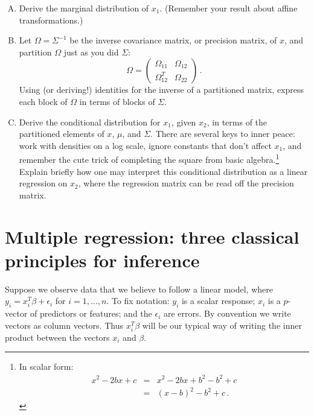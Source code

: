 \documentclass{mynotes}
\begin{document}
\begin{enumerate}[(A)]

\item Derive the marginal distribution of $x_1$. (Remember your result about affine transformations.)

\item Let $\Omega = \Sigma^{-1}$ be the inverse covariance matrix, or precision matrix, of $x$, and partition $\Omega$ just as you did $\Sigma$:
$$
\Omega =
\left(
\begin{array}{cc}
\Omega_{11} & \Omega_{12} \\
\Omega_{12}^T & \Omega_{22} 
\end{array}
\right) \, .
$$
Using (or deriving!) identities for the inverse of a partitioned matrix, express each block of $\Omega$ in terms of blocks of $\Sigma$.

\item Derive the conditional distribution for $x_1$, given $x_2$, in terms of the partitioned elements of $x$, $\mu$, and $\Sigma$.  There are several keys to inner peace: work with densities on a log scale, ignore constants that don't affect $x_1$, and remember the cute trick of completing the square from basic algebra.\footnote{In scalar form:
\begin{eqnarray*}
x^2 - 2bx + c &=& x^2 - 2bx + b^2 - b^2 + c \\
&=& (x-b)^2 - b^2 + c \, .
\end{eqnarray*}
}
Explain briefly how one may interpret this conditional distribution as a linear regression on $x_2$, where the regression matrix can be read off the precision matrix.

\end{enumerate}


\section{Multiple regression: three classical principles for inference}

Suppose we observe data that we believe to follow a linear model, where $y_i = x_i^T \beta + \epsilon_i$ for $i = 1, \ldots, n$.
To fix notation: $y_i$ is a scalar response; $x_i$ is a $p$-vector of predictors or features; and the $\epsilon_i$ are errors.  By convention we write vectors as column vectors.  Thus $x_i^T \beta$ will be our typical way of writing the inner product between the vectors $x_i$ and $\beta$.
\end{document}
